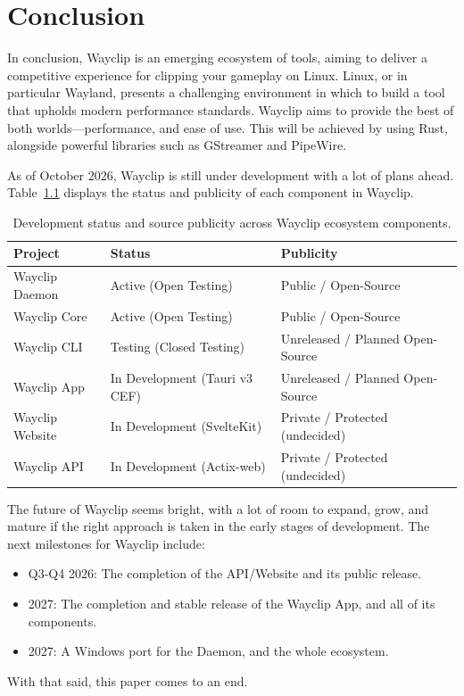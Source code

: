 \chapter{Conclusion}

In conclusion, Wayclip is an emerging ecosystem of tools, aiming to deliver a competitive experience for clipping your gameplay on Linux.
Linux, or in particular Wayland, presents a challenging environment in which to build a tool that upholds modern performance standards.
Wayclip aims to provide the best of both worlds---performance, and ease of use. This will be achieved by using Rust, alongside powerful libraries such as GStreamer and PipeWire.

As of October 2026, Wayclip is still under development with a lot of plans ahead.
Table~\ref{tab:project_status} displays the status and publicity of each component in Wayclip.

\begin{table}[htbp]
	\centering
	\begin{tabular}{lll}
		\hline
		\textbf{Project} & \textbf{Status}               & \textbf{Publicity}               \\ \hline
		Wayclip Daemon   & Active (Open Testing)         & Public / Open-Source             \\
		Wayclip Core     & Active (Open Testing)         & Public / Open-Source             \\
		Wayclip CLI      & Testing (Closed Testing)      & Unreleased / Planned Open-Source \\
		Wayclip App      & In Development (Tauri v3 CEF) & Unreleased / Planned Open-Source \\
		Wayclip Website  & In Development (SvelteKit)    & Private / Protected (undecided)  \\
		Wayclip API      & In Development (Actix-web)    & Private / Protected (undecided)  \\ \hline
	\end{tabular}
	\caption{Development status and source publicity across Wayclip ecosystem components.}
	\label{tab:project_status}
\end{table}

The future of Wayclip seems bright, with a lot of room to expand, grow, and mature if the right approach is taken in the early stages of development.
The next milestones for Wayclip include:
\begin{itemize}
	\item Q3-Q4 2026: The completion of the API/Website and its public release.
	\item 2027: The completion and stable release of the Wayclip App, and all of its components.
	\item 2027: A Windows port for the Daemon, and the whole ecosystem.
\end{itemize}

\bigskip

With that said, this paper comes to an end.
